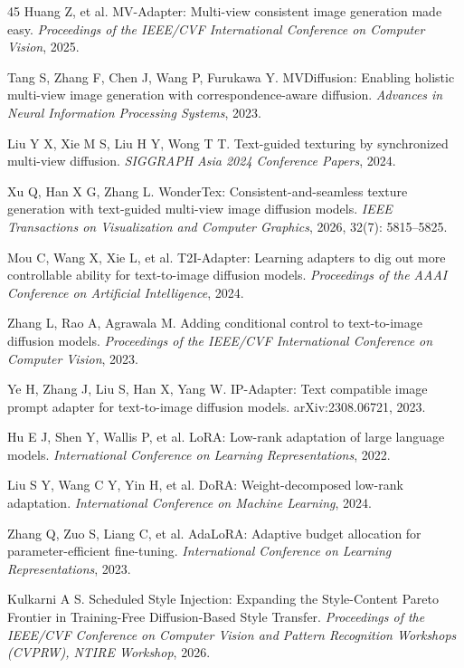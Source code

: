 \documentclass[times,twocolumn,final]{elsarticle}
\begin{document}
\begin{thebibliography}{45}
Huang Z, et al. MV-Adapter: Multi-view consistent image generation made easy. \textit{Proceedings of the IEEE/CVF International Conference on Computer Vision}, 2025.

Tang S, Zhang F, Chen J, Wang P, Furukawa Y. MVDiffusion: Enabling holistic multi-view image generation with correspondence-aware diffusion. \textit{Advances in Neural Information Processing Systems}, 2023.

Liu Y X, Xie M S, Liu H Y, Wong T T. Text-guided texturing by synchronized multi-view diffusion. \textit{SIGGRAPH Asia 2024 Conference Papers}, 2024.

Xu Q, Han X G, Zhang L. WonderTex: Consistent-and-seamless texture generation with text-guided multi-view image diffusion models. \textit{IEEE Transactions on Visualization and Computer Graphics}, 2026, 32(7): 5815--5825.

Mou C, Wang X, Xie L, et al. T2I-Adapter: Learning adapters to dig out more controllable ability for text-to-image diffusion models. \textit{Proceedings of the AAAI Conference on Artificial Intelligence}, 2024.

Zhang L, Rao A, Agrawala M. Adding conditional control to text-to-image diffusion models. \textit{Proceedings of the IEEE/CVF International Conference on Computer Vision}, 2023.

Ye H, Zhang J, Liu S, Han X, Yang W. IP-Adapter: Text compatible image prompt adapter for text-to-image diffusion models. arXiv:2308.06721, 2023.

Hu E J, Shen Y, Wallis P, et al. LoRA: Low-rank adaptation of large language models. \textit{International Conference on Learning Representations}, 2022.

Liu S Y, Wang C Y, Yin H, et al. DoRA: Weight-decomposed low-rank adaptation. \textit{International Conference on Machine Learning}, 2024.

Zhang Q, Zuo S, Liang C, et al. AdaLoRA: Adaptive budget allocation for parameter-efficient fine-tuning. \textit{International Conference on Learning Representations}, 2023.

Kulkarni A S. Scheduled Style Injection: Expanding the Style-Content Pareto Frontier in Training-Free Diffusion-Based Style Transfer. \textit{Proceedings of the IEEE/CVF Conference on Computer Vision and Pattern Recognition Workshops (CVPRW), NTIRE Workshop}, 2026.


\end{thebibliography}
\end{document}
